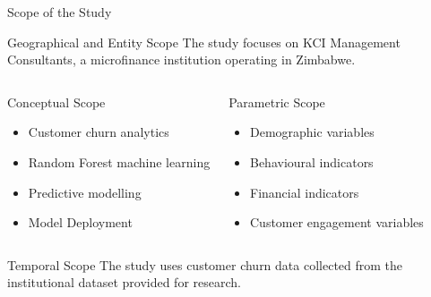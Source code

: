 \documentclass[10pt]{beamer}
\begin{document}
	
\begin{frame}{Scope of the Study}
	
	\small
	
	\begin{block}{Geographical and Entity Scope}
		The study focuses on KCI Management Consultants, a microfinance institution operating in Zimbabwe.
	\end{block}
	
	\vspace{0.3cm}
	
	\begin{columns}
		
		
		\begin{exampleblock}{Conceptual Scope}
			\begin{itemize}
				\item Customer churn analytics
				
				\item Random Forest machine learning
				
				\item Predictive modelling
				
				\item Model Deployment
			\end{itemize}
		\end{exampleblock}
		
		
		\begin{exampleblock}{Parametric Scope}
			\begin{itemize}
				\item Demographic variables
				\item Behavioural indicators
				\item Financial indicators
				\item Customer engagement variables
			\end{itemize}
		\end{exampleblock}
		
	\end{columns}
	
	\vspace{0.3cm}
	
	\begin{block}{Temporal Scope}
		The study uses customer churn data collected from the institutional dataset provided for research.
	\end{block}
	
\end{frame}
	
\end{document}
